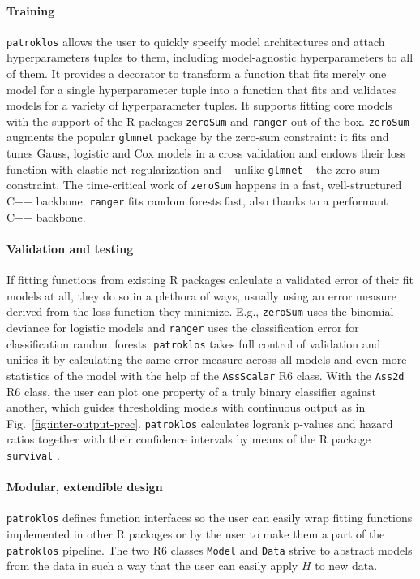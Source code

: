 \paragraph{Training} 
\texttt{patroklos} allows the user to quickly specify model architectures and 
attach hyperparameters tuples to them, including model-agnostic hyperparameters to all of them. It 
provides a decorator to transform a function that fits merely one model for a single hyperparameter 
tuple into a function that fits and validates models for a variety of hyperparameter tuples. 
It supports fitting core models with the support of the R packages \texttt{zeroSum} 
\cite{zerosumR} and \texttt{ranger} \cite{ranger17} out of the box. \texttt{zeroSum} 
augments the popular \texttt{glmnet} package by the zero-sum constraint: it fits and 
tunes Gauss, logistic and Cox models in a cross validation and endows their loss function 
with elastic-net regularization and -- unlike \texttt{glmnet} -- the zero-sum 
constraint. The time-critical work of \texttt{zeroSum} happens in a fast, well-structured C++ 
backbone. \texttt{ranger} fits random forests fast, also thanks to a performant C++ backbone. 

\paragraph{Validation and testing} 
If fitting functions from existing R packages calculate a validated error of 
their fit models at all, they do so in a plethora of ways, usually using an error measure derived 
from the loss function they minimize. E.g., \texttt{zeroSum} uses the binomial deviance for 
logistic models and \texttt{ranger} uses the classification error for classification random 
forests. \texttt{patroklos} takes 
full control of validation and unifies it
by calculating the same error measure across all models and even more statistics of the model
with the help of the \texttt{AssScalar} R6 class. With the \texttt{Ass2d} R6 class, the 
user can plot one property of a truly binary classifier against another, which guides 
thresholding models with continuous output as in Fig.\ \ref{fig:inter-output-prec}. 
\texttt{patroklos} calculates logrank p-values and hazard ratios together with their confidence
intervals by means of the R package \texttt{survival} \cite{survival-cran}.

\paragraph{Modular, extendible design} 
\texttt{patroklos} defines function interfaces so the user 
can easily wrap fitting functions implemented in other R packages or by the user to make 
them a part of the \texttt{patroklos} pipeline. The two R6 classes \texttt{Model} and \texttt{Data}
strive to abstract models from the data in such a way that the user can easily apply $H$ to new 
data.

